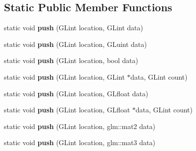\subsection*{Static Public Member Functions}
\begin{DoxyCompactItemize}
\item 
\mbox{\label{classflw_1_1flc_1_1Uniform_a212cd5958ac571eff65f862f1fce53e3}} 
static void {\bfseries push} (G\+Lint location, G\+Lint data)
\item 
\mbox{\label{classflw_1_1flc_1_1Uniform_a36b4ff8d1242a9bfbaa7dd3ba27a101a}} 
static void {\bfseries push} (G\+Lint location, G\+Luint data)
\item 
\mbox{\label{classflw_1_1flc_1_1Uniform_a51874d5a294d83bd91211907321bc5f1}} 
static void {\bfseries push} (G\+Lint location, bool data)
\item 
\mbox{\label{classflw_1_1flc_1_1Uniform_a1b61578b090a9bd2f22427f99d4cb3af}} 
static void {\bfseries push} (G\+Lint location, G\+Lint $\ast$data, G\+Lint count)
\item 
\mbox{\label{classflw_1_1flc_1_1Uniform_ac20d2322e07f68173b05da46efb3be7b}} 
static void {\bfseries push} (G\+Lint location, G\+Lfloat data)
\item 
\mbox{\label{classflw_1_1flc_1_1Uniform_a9e453a3b388dc74fa1d46efbfe56ae68}} 
static void {\bfseries push} (G\+Lint location, G\+Lfloat $\ast$data, G\+Lint count)
\item 
\mbox{\label{classflw_1_1flc_1_1Uniform_ac8bdc4548e563192bfec2dd8d86549b0}} 
static void {\bfseries push} (G\+Lint location, glm\+::mat2 data)
\item 
\mbox{\label{classflw_1_1flc_1_1Uniform_aee5e184bf60d8fcffea74997b98fad47}} 
static void {\bfseries push} (G\+Lint location, glm\+::mat3 data)
\item 
\mbox{\label{classflw_1_1flc_1_1Uniform_aa64cb2768bfbb742585f2fba511b0c16}} 

\end{DoxyCompactItemize}
